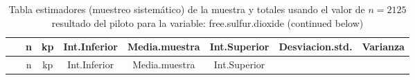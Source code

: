 \documentclass[
]{article}
\begin{document}
\begin{longtable}[]{@{}cccccccc@{}}
\caption{Tabla estimadores (muestreo sistemático) de la muestra y
totales usando el valor de \(n = 2125\) resultado del piloto para la
variable: free.sulfur.dioxide (continued below)}\tabularnewline
\toprule
\begin{minipage}[b]{0.18\columnwidth}\centering
~\strut
\end{minipage} & \begin{minipage}[b]{0.05\columnwidth}\centering
n\strut
\end{minipage} & \begin{minipage}[b]{0.03\columnwidth}\centering
kp\strut
\end{minipage} & \begin{minipage}[b]{0.10\columnwidth}\centering
Int.Inferior\strut
\end{minipage} & \begin{minipage}[b]{0.11\columnwidth}\centering
Media.muestra\strut
\end{minipage} & \begin{minipage}[b]{0.10\columnwidth}\centering
Int.Superior\strut
\end{minipage} & \begin{minipage}[b]{0.12\columnwidth}\centering
Desviacion.std.\strut
\end{minipage} & \begin{minipage}[b]{0.08\columnwidth}\centering
Varianza\strut
\end{minipage}\tabularnewline
\midrule
\endfirsthead
\toprule
\begin{minipage}[b]{0.18\columnwidth}\centering
~\strut
\end{minipage} & \begin{minipage}[b]{0.05\columnwidth}\centering
n\strut
\end{minipage} & \begin{minipage}[b]{0.03\columnwidth}\centering
kp\strut
\end{minipage} & \begin{minipage}[b]{0.10\columnwidth}\centering
Int.Inferior\strut
\end{minipage} & \begin{minipage}[b]{0.11\columnwidth}\centering
Media.muestra\strut
\end{minipage} & \begin{minipage}[b]{0.10\columnwidth}\centering
Int.Superior\strut
\end{minipage} & \begin{minipage}[b]{0.12\columnwidth}\centering

\end{minipage}
\end{longtable}
\end{document}
